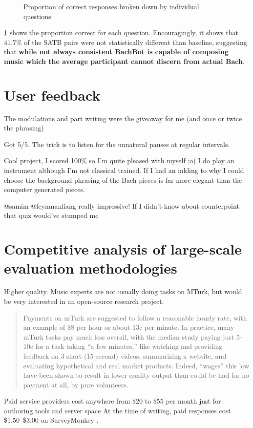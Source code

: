 \begin{figure}[tb]
  \centering
  
  \caption{Proportion of correct responses broken down by individual questions.}
  \label{fig:responses-name}
\end{figure}

\cref{fig:responses-name} shows the proportion correct for each question.
Encouragingly, it shows that $41.7\%$ of the SATB pairs were not
statistically different than baseline, suggesting that \textbf{while not always
consistent BachBot is capable of composing music which the average participant
cannot discern from actual Bach}.


\section{User feedback}

The modulations and part writing were the giveaway for me (and once or twice the phrasing)

Got 5/5. The trick is to listen for the unnatural pauses at regular intervals.

Cool project, I scored 100\% so I'm quite pleased with myself ;o) I do
play an instrument although I'm not classical trained. If I had an
inkling to why I could choose the background phrasing of the Bach
pieces is far more elegant than the computer generated pieces.

@samim @feynmanliang really impressive! If I didn't know about counterpoint that quiz would've stumped me

\section{Competitive analysis of large-scale evaluation methodologies}



Higher quality. Music experts are not usually doing tasks on MTurk, but would be
very interested in an open-source research project.

\begin{quote}
Payments on mTurk are suggested to follow a reasonable hourly rate, with an
example of \$8 per hour or about 13c per minute. In practice, many mTurk
tasks pay much less overall, with the median study paying just 5-10c for a task
taking ``a few minutes,'' like watching and providing feedback on 3 short
(15-second) videos, summarizing a website, and evaluating hypothetical and real
market products. Indeed, ``wages'' this low have been shown to result in lower
quality output than could be had for no payment at all, by pure volunteers.
\end{quote}
\citep{downs2010your}

Paid service providers cost anywhere from \$20 to \$55 per month
just for authoring tools and server space\citep{JCC4:JCC411} At the time of writing,
paid responses cost \$1.50--\$3.00 on SurveyMonkey \citep{uksurveymonkey}.
